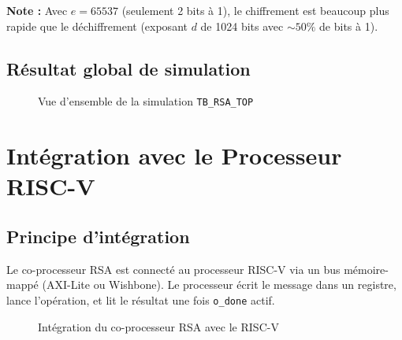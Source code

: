 \documentclass[12pt,a4paper]{report}
\begin{document}
\textbf{Note :} Avec $e = 65537$ (seulement 2 bits à 1), le chiffrement
est beaucoup plus rapide que le déchiffrement (exposant $d$ de 1024 bits
avec $\sim 50\%$ de bits à 1).

\subsection{Résultat global de simulation}
\begin{figure}[H]
\centering
{}
\caption{Vue d'ensemble de la simulation \texttt{TB\_RSA\_TOP}}
\label{fig:sim_full}
\end{figure}


\section{Intégration avec le Processeur RISC-V}
\label{ch:riscv}

\subsection{Principe d'intégration}

Le co-processeur RSA est connecté au processeur RISC-V via un bus
mémoire-mappé (AXI-Lite ou Wishbone). Le processeur écrit le message
dans un registre, lance l'opération, et lit le résultat une fois
\texttt{o\_done} actif.

\begin{figure}[H]
\centering
{}
\caption{Intégration du co-processeur RSA avec le RISC-V}
\label{fig:integration}
\end{figure}
\end{document}
